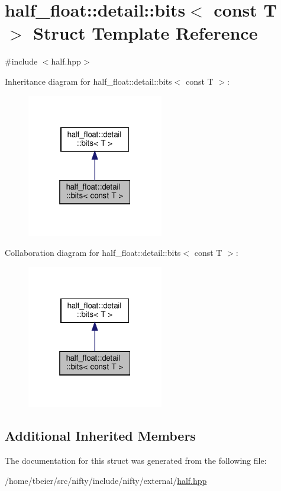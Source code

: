 \hypertarget{structhalf__float_1_1detail_1_1bits_3_01const_01T_01_4}{}\section{half\+\_\+float\+:\+:detail\+:\+:bits$<$ const T $>$ Struct Template Reference}
\label{structhalf__float_1_1detail_1_1bits_3_01const_01T_01_4}


{\ttfamily \#include $<$half.\+hpp$>$}



Inheritance diagram for half\+\_\+float\+:\+:detail\+:\+:bits$<$ const T $>$\+:
\nopagebreak
\begin{figure}[H]
\begin{center}
\leavevmode
\includegraphics[width=169pt]{structhalf__float_1_1detail_1_1bits_3_01const_01T_01_4__inherit__graph}
\end{center}
\end{figure}


Collaboration diagram for half\+\_\+float\+:\+:detail\+:\+:bits$<$ const T $>$\+:
\nopagebreak
\begin{figure}[H]
\begin{center}
\leavevmode
\includegraphics[width=169pt]{structhalf__float_1_1detail_1_1bits_3_01const_01T_01_4__coll__graph}
\end{center}
\end{figure}
\subsection*{Additional Inherited Members}


The documentation for this struct was generated from the following file\+:\begin{DoxyCompactItemize}
\item 
/home/tbeier/src/nifty/include/nifty/external/\hyperlink{half_8hpp}{half.\+hpp}\end{DoxyCompactItemize}
